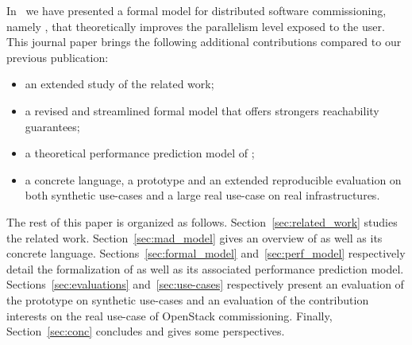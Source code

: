 
In~\cite{chardet:hal-01858150} we have presented a formal model for
distributed software commissioning, namely \mad, that theoretically
improves the parallelism level exposed to the user. This journal paper
brings the following additional contributions compared to our previous
publication:
\begin{itemize}
\item an extended study of the related work;
\item a revised and streamlined \mad formal model that offers
  strongers reachability guarantees;
\item a theoretical performance prediction model of \mad;
\item a concrete language, a prototype and an extended reproducible
  evaluation on both synthetic use-cases and a large real use-case
  on real infrastructures.
\end{itemize}

The rest of this paper is organized as
follows. Section~\ref{sec:related_work} studies the related
work. Section~\ref{sec:mad_model} gives an overview of \mad as well as
its concrete language. Sections~\ref{sec:formal_model}
and~\ref{sec:perf_model} respectively detail the formalization of \mad
as well as its associated performance prediction
model. Sections~\ref{sec:evaluations} and~\ref{sec:use-cases}
respectively present an evaluation of the \mad prototype on synthetic
use-cases and an evaluation of the contribution interests on the real
use-case of OpenStack commissioning.  Finally, Section~\ref{sec:conc}
concludes and gives some perspectives.


